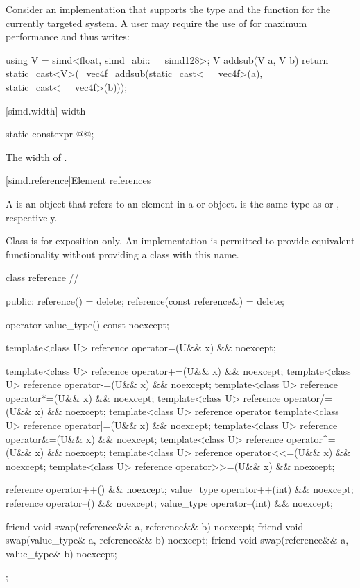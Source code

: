 \begin{example}
  Consider an implementation that supports the type  and the function  for the currently targeted system.
  A user may require the use of  for maximum performance and thus writes:
  \begin{codeblock}
    using V = simd<float, simd_abi::__simd128>;
    V addsub(V a, V b) {
      return static_cast<V>(_vec4f_addsub(static_cast<__vec4f>(a), static_cast<__vec4f>(b)));
    }
  \end{codeblock}
\end{example}

[simd.width]{ width}

\begin{itemdecl}
static constexpr @@;
\end{itemdecl}

\begin{itemdescr}
  \pnum\returns
  The width of .
\end{itemdescr}

[simd.reference]{Element references}

\pnum
A  is an object that refers to an element in a  or  object.  is the same type as  or , respectively.

\pnum
Class  is for exposition only. An implementation is permitted to provide equivalent functionality without providing a class with this name.

\begin{codeblock}
class reference // \expos
{
public:
  reference() = delete;
  reference(const reference&) = delete;

  operator value_type() const noexcept;

  template<class U> reference operator=(U&& x) && noexcept;

  template<class U> reference operator+=(U&& x) && noexcept;
  template<class U> reference operator-=(U&& x) && noexcept;
  template<class U> reference operator*=(U&& x) && noexcept;
  template<class U> reference operator/=(U&& x) && noexcept;
  template<class U> reference operator%
  template<class U> reference operator|=(U&& x) && noexcept;
  template<class U> reference operator&=(U&& x) && noexcept;
  template<class U> reference operator^=(U&& x) && noexcept;
  template<class U> reference operator<<=(U&& x) && noexcept;
  template<class U> reference operator>>=(U&& x) && noexcept;

  reference operator++() && noexcept;
  value_type operator++(int) && noexcept;
  reference operator--() && noexcept;
  value_type operator--(int) && noexcept;

  friend void swap(reference&& a, reference&& b) noexcept;
  friend void swap(value_type& a, reference&& b) noexcept;
  friend void swap(reference&& a, value_type& b) noexcept;
};
\end{codeblock}

